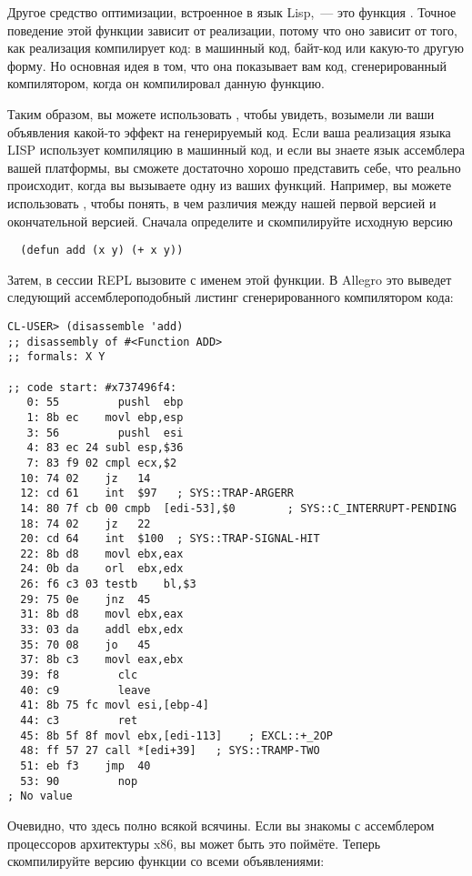 Другое средство оптимизации, встроенное в язык Lisp,~--- это функция
. Точное поведение этой функции зависит от реализации, потому что оно
зависит от того, как реализация компилирует код: в машинный код, байт-код или какую-то
другую форму. Но основная идея в том, что она показывает вам код, сгенерированный
компилятором, когда он компилировал данную функцию.

Таким образом, вы можете использовать , чтобы увидеть, возымели ли ваши
объявления какой-то эффект на генерируемый код. Если ваша реализация языка LISP использует
компиляцию в машинный код, и если вы знаете язык ассемблера вашей платформы, вы сможете
достаточно хорошо представить себе, что реально происходит, когда вы вызываете одну из
ваших функций. Например, вы можете использовать , чтобы понять, в чем
различия между нашей первой версией  и окончательной версией. Сначала определите
и скомпилируйте исходную версию

\begin{lstlisting}
  (defun add (x y) (+ x y))
\end{lstlisting}

Затем, в сессии REPL вызовите  с именем этой функции. В Allegro это
выведет следующий ассемблероподобный листинг сгенерированного компилятором кода:

\begin{lstlisting}
CL-USER> (disassemble 'add)
;; disassembly of #<Function ADD>
;; formals: X Y

;; code start: #x737496f4:
   0: 55         pushl	ebp
   1: 8b ec    movl	ebp,esp
   3: 56         pushl	esi
   4: 83 ec 24 subl	esp,$36
   7: 83 f9 02 cmpl	ecx,$2
  10: 74 02    jz	14
  12: cd 61    int	$97   ; SYS::TRAP-ARGERR
  14: 80 7f cb 00 cmpb	[edi-53],$0        ; SYS::C_INTERRUPT-PENDING
  18: 74 02    jz	22
  20: cd 64    int	$100  ; SYS::TRAP-SIGNAL-HIT
  22: 8b d8    movl	ebx,eax
  24: 0b da    orl	ebx,edx
  26: f6 c3 03 testb	bl,$3
  29: 75 0e    jnz	45
  31: 8b d8    movl	ebx,eax
  33: 03 da    addl	ebx,edx
  35: 70 08    jo	45
  37: 8b c3    movl	eax,ebx
  39: f8         clc
  40: c9         leave
  41: 8b 75 fc movl	esi,[ebp-4]
  44: c3         ret
  45: 8b 5f 8f movl	ebx,[edi-113]    ; EXCL::+_2OP
  48: ff 57 27 call	*[edi+39]   ; SYS::TRAMP-TWO
  51: eb f3    jmp	40
  53: 90         nop
; No value
\end{lstlisting}

Очевидно, что здесь полно всякой всячины. Если вы знакомы с ассемблером процессоров
архитектуры x86, вы может быть это поймёте. Теперь скомпилируйте версию функции 
со всеми объявлениями:


